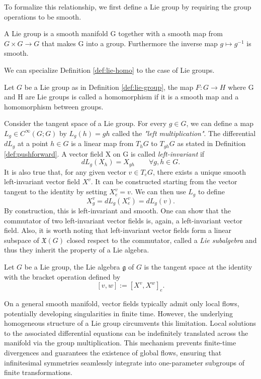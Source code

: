 To formalize this relationship, we first define a Lie group by requiring the group operations to be smooth.

\begin{definition}\label{def:lie-group}
	A Lie group is a smooth manifold G together with a smooth map from $G \times G \to G$ that makes G into a group. Furthermore the inverse map $g \mapsto g^{-1}$ is smooth.
\end{definition}

\noindent We can specialize Definition \ref{def:lie-homo} to the case of Lie groups.

\begin{definition}\label{def:lie-grhomo}
	Let $G$ be a Lie group as in Definition \ref{def:lie-group}, the map $F: G \to H$ where G and H are Lie groups is called a homomorphism if it is a smooth map and a homomorphism between groups.
\end{definition}

Consider the tangent space of a Lie group. For every $g \in G$, we can define a map $L_g \in C^\infty(G;G)$ by $L_g(h) = gh$ called the \textit{"left multiplication"}. The differential $dL_g$ at a point $h \in G$ is a linear map from $T_hG$ to $T_{gh}G$ as stated in Definition \ref{def:pushforward}. A vector field X on G is called \textit{left-invariant} if
\[
	dL_g (X_h) = X_{gh} \qquad \forall g,h \in G.
\]
It is also true that, for any given vector $v \in T_eG$, there exists a unique smooth left-invariant vector field $X^v$. It can be constructed starting from the vector tangent to the identity by setting $X^v_e = v$. We can then use $L_g$ to define
\[
	X^v_g = dL_g (X^v_e) = dL_g(v).
\]
By construction, this is left-invariant and smooth.
One can show that the commutator of two left-invariant vector fields is, again, a left-invariant vector field. Also, it is worth noting that left-invariant vector fields form a linear subspace of $\mathfrak{X}(G)$ closed respect to the commutator, called a \textit{Lie subalgebra} and thus they inherit the property of a Lie algebra. 

\begin{definition}\label{def:lie-gralg}
	Let $G$ be a Lie group, the Lie algebra $\mathfrak{g}$ of $G$ is the tangent space at the identity with the bracket operation defined by
	\[
		[v, w] := [X^v, X^w]_e.
	\] 
\end{definition}

\noindent On a general smooth manifold, vector fields typically admit only local flows, potentially developing singularities in finite time. However, the underlying homogeneous structure of a Lie group circumvents this limitation. Local solutions to the associated differential equations can be indefinitely translated across the manifold via the group multiplication. This mechanism prevents finite-time divergences and guarantees the existence of global flows, ensuring that infinitesimal symmetries seamlessly integrate into one-parameter subgroups of finite transformations. 

